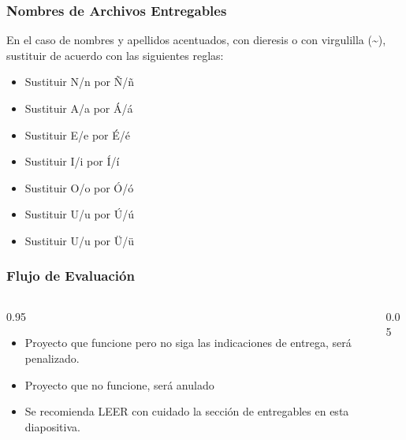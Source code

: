 \begin{frame}
\frametitle{Nombres de Archivos Entregables}
En el caso de nombres y apellidos acentuados, con dieresis o con virgulilla (\textasciitilde{}), sustituir de acuerdo con las siguientes reglas:
\begin{itemize}
\item Sustituir N/n por \~N/\~n
\item Sustituir A/a por \'A/\'a
\item Sustituir E/e por \'E/\'e
\item Sustituir I/i por \'I/\'i
\item Sustituir O/o por \'O/\'o
\item Sustituir U/u por \'U/\'u
\item Sustituir U/u por \"U/\"u
\end{itemize}
\end{frame}



\begin{frame}
\frametitle{Flujo de Evaluaci\'on}
\begin{columns}
\begin{column}{0.95\textwidth}
\begin{itemize}
\item Proyecto que funcione pero no siga las indicaciones de entrega, ser\'a penalizado.
\item Proyecto que no funcione, será anulado 
\item Se recomienda LEER con cuidado la secci\'on de entregables en esta diapositiva.
\end{itemize}
\end{column}
\begin{column}{0.05\textwidth}
\end{column}
\end{columns}
\end{frame}



